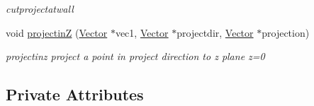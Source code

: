 \begin{DoxyCompactItemize}
\begin{DoxyCompactList}\small\item\em cutprojectatwall \end{DoxyCompactList}\item 
void \hyperlink{class_total_energy_calculator_ac5d1c3dde1b6986d95ff40254ed10419}{projectin\+Z} (\hyperlink{class_vector}{Vector} $\ast$vec1, \hyperlink{class_vector}{Vector} $\ast$projectdir, \hyperlink{class_vector}{Vector} $\ast$projection)
\begin{DoxyCompactList}\small\item\em projectinz project a point in project direction to z plane z=0 \end{DoxyCompactList}\end{DoxyCompactItemize}
\subsection*{Private Attributes}
